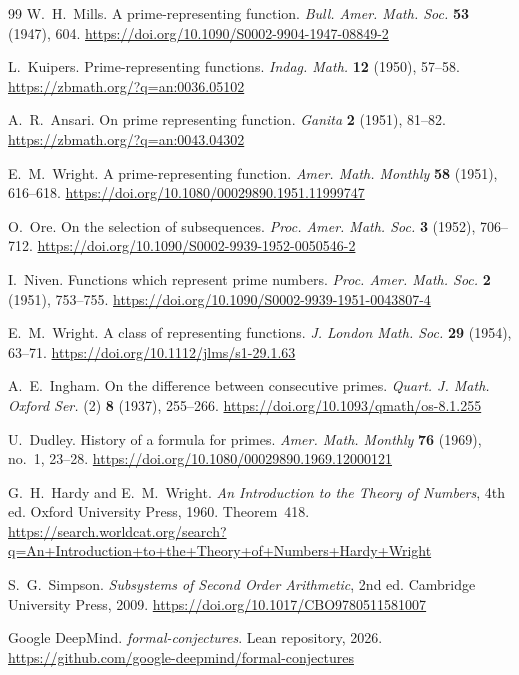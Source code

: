 \documentclass[11pt,reqno]{amsart}
\theoremstyle{redplain}
\numberwithin{equation}{section}
\begin{document}
\begin{thebibliography}{99}
 W.~H.~Mills. A prime-representing function. \emph{Bull.
Amer. Math. Soc.} \textbf{53} (1947), 604. %
\url{https://doi.org/10.1090/S0002-9904-1947-08849-2}

 L.~Kuipers. Prime-representing functions. \emph{Indag.
Math.} \textbf{12} (1950), 57--58. \url{https://zbmath.org/?q=an:0036.05102}

 A.~R.~Ansari. On prime representing function. \emph{%
Ganita} \textbf{2} (1951), 81--82. \url{https://zbmath.org/?q=an:0043.04302}

 E.~M.~Wright. A prime-representing function. \emph{%
Amer. Math. Monthly} \textbf{58} (1951), 616--618. %
\url{https://doi.org/10.1080/00029890.1951.11999747}

 O.~Ore. On the selection of subsequences. \emph{Proc.
Amer. Math. Soc.} \textbf{3} (1952), 706--712. %
\url{https://doi.org/10.1090/S0002-9939-1952-0050546-2}

 I.~Niven. Functions which represent prime numbers. \emph{%
Proc. Amer. Math. Soc.} \textbf{2} (1951), 753--755. %
\url{https://doi.org/10.1090/S0002-9939-1951-0043807-4}

 E.~M.~Wright. A class of representing functions. \emph{%
J. London Math. Soc.} \textbf{29} (1954), 63--71. %
\url{https://doi.org/10.1112/jlms/s1-29.1.63}

 A.~E.~Ingham. On the difference between consecutive
primes. \emph{Quart. J. Math. Oxford Ser.} (2) \textbf{8} (1937), 255--266. %
\url{https://doi.org/10.1093/qmath/os-8.1.255}

 U.~Dudley. History of a formula for primes. \emph{Amer.
Math. Monthly} \textbf{76} (1969), no.~1, 23--28. %
\url{https://doi.org/10.1080/00029890.1969.12000121}

 G.~H.~Hardy and E.~M.~Wright. \emph{An
Introduction to the Theory of Numbers}, 4th ed. Oxford University Press,
1960. Theorem~418. %
\url{https://search.worldcat.org/search?q=An+Introduction+to+the+Theory+of+Numbers+Hardy+Wright}

 S.~G.~Simpson. \emph{Subsystems of Second Order
Arithmetic}, 2nd ed. Cambridge University Press, 2009. %
\url{https://doi.org/10.1017/CBO9780511581007}

 Google DeepMind. \emph{formal-conjectures}. Lean
repository, 2026. \url{https://github.com/google-deepmind/formal-conjectures}


\end{thebibliography}
\end{document}
